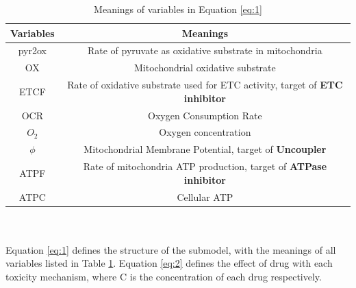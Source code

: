\documentclass[12pt]{article}
\begin{document}
\begin{table}
\begin{tabular}{|c | c|} 
 \hline
 \textbf{Variables} & \textbf{Meanings} \\
 \hline\hline
 pyr2ox & Rate of pyruvate as oxidative substrate in mitochondria \\ 
 \hline
   OX & Mitochondrial oxidative substrate\\
 \hline
  ETCF & Rate of oxidative substrate used for ETC activity, target of \textbf{ETC inhibitor}\\
 \hline
 OCR & Oxygen Consumption Rate\\
 \hline
 $O_2$ & Oxygen concentration \\
  \hline

 $\phi$ & Mitochondrial Membrane Potential, target of \textbf{Uncoupler}\\
 \hline
 ATPF & Rate of mitochondria ATP production, target of \textbf{ATPase inhibitor}\\
 \hline
 ATPC & Cellular ATP\\
 \hline
\end{tabular}
\caption{Meanings of variables in Equation \ref{eq:1}}
\label{Tab:1}
\end{table}\\\\Equation \ref{eq:1} defines the structure of the submodel, with the meanings of all variables listed in Table \ref{Tab:1}. Equation \ref{eq:2} defines the effect of drug with each toxicity mechanism, where C is the concentration of each drug respectively.
\end{document}
